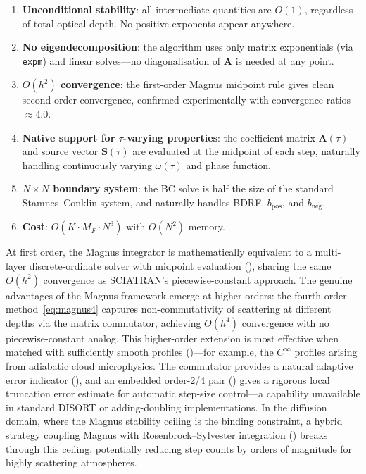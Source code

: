 \documentclass[11pt,a4paper]{article}
\newcommand{\vect}[1]{\bm{#1}}
\newcommand{\mat}[1]{\mathbf{#1}}
\theoremstyle{definition}
\begin{document}
\begin{enumerate}[nosep]
\item \textbf{Unconditional stability}: all intermediate quantities
  are $O(1)$, regardless of total optical depth.
  No positive exponents appear anywhere.
\item \textbf{No eigendecomposition}: the algorithm uses only matrix
  exponentials (via \texttt{expm}) and linear solves---no
  diagonalisation of $\mat{A}$ is needed at any point.
\item \textbf{$O(h^2)$ convergence}: the first-order Magnus midpoint
  rule gives clean second-order convergence, confirmed experimentally
  with convergence ratios $\approx 4.0$.
\item \textbf{Native support for $\tau$-varying properties}: the
  coefficient matrix $\mat{A}(\tau)$ and source vector $\vect{S}(\tau)$
  are evaluated at the midpoint of each step, naturally handling
  continuously varying $\omega(\tau)$ and phase function.
\item \textbf{$N\!\times\!N$ boundary system}: the BC solve
  is half the size of the standard Stamnes--Conklin system, and
  naturally handles BDRF, $b_{\text{pos}}$, and $b_{\text{neg}}$.
\item \textbf{Cost}: $O(K\cdot M_F\cdot N^3)$ with $O(N^2)$ memory.
\end{enumerate}

At first order, the Magnus integrator is mathematically equivalent to a
multi-layer discrete-ordinate solver with midpoint evaluation
(), sharing the same $O(h^2)$ convergence as
SCIATRAN's piecewise-constant approach.  The genuine advantages of the
Magnus framework emerge at higher orders: the fourth-order
method~\eqref{eq:magnus4} captures non-commutativity of scattering at
different depths via the matrix commutator, achieving $O(h^4)$
convergence with no piecewise-constant analog.  This higher-order
extension is most effective when matched with sufficiently smooth
profiles ()---for example, the $C^\infty$
profiles arising from adiabatic cloud microphysics.  The commutator provides a natural
adaptive error indicator (), and an embedded
order-2/4 pair () gives a rigorous local
truncation error estimate for automatic step-size control---a capability
unavailable in standard DISORT or adding-doubling implementations.
In the diffusion domain, where the Magnus stability ceiling is the
binding constraint, a hybrid strategy coupling Magnus with
Rosenbrock--Sylvester integration () breaks
through this ceiling, potentially reducing step counts by orders of
magnitude for highly scattering atmospheres.
\end{document}
